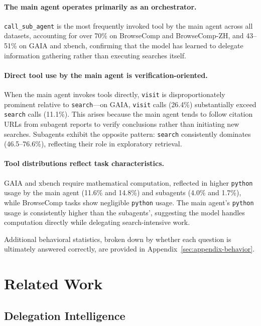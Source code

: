 \documentclass{llmxive}
\begin{document}
\paragraph{The main agent operates primarily as an orchestrator.} \texttt{call\_sub\_agent} is the most frequently invoked tool by the main agent across all datasets, accounting for over 70\% on BrowseComp and BrowseComp-ZH, and 43--51\% on GAIA and xbench, confirming that the model has learned to delegate information gathering rather than executing searches itself.

\paragraph{Direct tool use by the main agent is verification-oriented.} When the main agent invokes tools directly, \texttt{visit} is disproportionately prominent relative to \texttt{search}---on GAIA, \texttt{visit} calls (26.4\%) substantially exceed \texttt{search} calls (11.1\%). This arises because the main agent tends to follow citation URLs from subagent reports to verify conclusions rather than initiating new searches. Subagents exhibit the opposite pattern: \texttt{search} consistently dominates (46.5--76.6\%), reflecting their role in exploratory retrieval.

\paragraph{Tool distributions reflect task characteristics.} GAIA and xbench require mathematical computation, reflected in higher \texttt{python} usage by the main agent (11.6\% and 14.8\%) and subagents (4.0\% and 1.7\%), while BrowseComp tasks show negligible \texttt{python} usage. The main agent's \texttt{python} usage is consistently higher than the subagents', suggesting the model handles computation directly while delegating search-intensive work.

Additional behavioral statistics, broken down by whether each question is ultimately answered correctly, are provided in Appendix~\ref{sec:appendix-behavior}.
\section{Related Work}
\label{sec:related}

\subsection{Delegation Intelligence}
\end{document}
